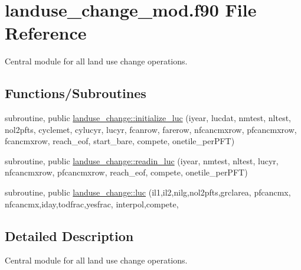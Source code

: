 \hypertarget{landuse__change__mod_8f90}{}\section{landuse\+\_\+change\+\_\+mod.\+f90 File Reference}
\label{landuse__change__mod_8f90}


Central module for all land use change operations.  


\subsection*{Functions/\+Subroutines}
{\bf }\par
\begin{DoxyCompactItemize}
\item 
subroutine, public \hyperlink{group__landuse__change__initialize__luc_gaaeec2aeebe84601010ea8cedab85c4c0}{landuse\+\_\+change\+::initialize\+\_\+luc} (iyear, lucdat, nmtest, nltest, nol2pfts, cyclemet, cylucyr, lucyr, fcanrow, farerow, nfcancmxrow, pfcancmxrow, fcancmxrow, reach\+\_\+eof, start\+\_\+bare, compete, onetile\+\_\+per\+P\+F\+T)
\end{DoxyCompactItemize}

{\bf }\par
\begin{DoxyCompactItemize}
\item 
subroutine, public \hyperlink{group__landuse__change__readin__luc_ga1d8b9a30b4c5c7692e39f3933bc2e13a}{landuse\+\_\+change\+::readin\+\_\+luc} (iyear, nmtest, nltest, lucyr, nfcancmxrow, pfcancmxrow, reach\+\_\+eof, compete, onetile\+\_\+per\+P\+F\+T)
\end{DoxyCompactItemize}

{\bf }\par
\begin{DoxyCompactItemize}
\item 
subroutine, public \hyperlink{group__landuse__change__luc_ga2c6b3a127a7a9e0357442ba402deb31b}{landuse\+\_\+change\+::luc} (il1,il2,nilg,nol2pfts,grclarea, pfcancmx, nfcancmx,iday,todfrac,yesfrac, interpol,compete,
\end{DoxyCompactItemize}

{\bf }\par

{\bf }\par



\subsection{Detailed Description}
Central module for all land use change operations. 

